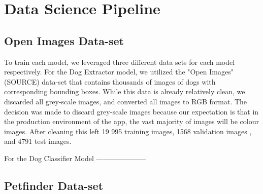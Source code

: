 \documentclass{article}
\begin{document}
\section{Data Science Pipeline}

\subsection{Open Images Data-set}

To train each model, we leveraged three different data sets for each model respectively.  For the Dog Extractor model, we utilized the "Open Images" (SOURCE) data-set that contains thousands of images of dogs with corresponding bounding boxes.  While this data is already relatively clean, we discarded all grey-scale images, and converted all images to RGB format.  The decision was made to discard grey-scale images because our expectation is that in the production environment of the app, the vast majority of images will be colour images.  After cleaning this left 19 995 training images, 1568 validation images , and 4791 test images.

For the Dog Classifier Model ---------------------

\subsection{Petfinder Data-set}
\end{document}
